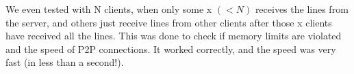 \documentclass[12pt]{scrartcl}
\begin{document}
We even tested with N clients, when only some x \((< N)\) receives the lines from the server, and others just receive lines from other clients after those x clients have received all the lines. This was done to check if memory limits are violated and the speed of P2P connections. It worked correctly, and the speed was very fast (in less than a second!). 
\end{document}
